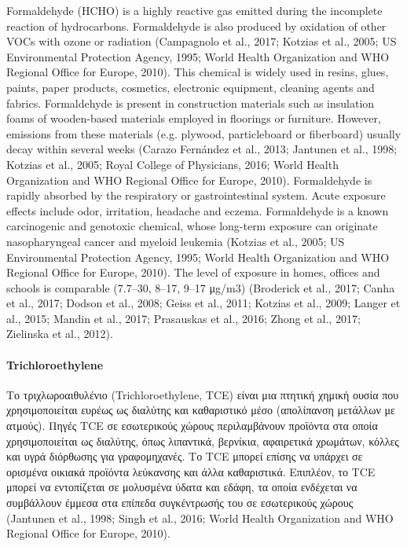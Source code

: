 Formaldehyde (HCHO) is a highly reactive gas emitted during the incomplete reaction of hydrocarbons. Formaldehyde is also produced by oxidation of other VOCs with ozone or radiation (Campagnolo et al., 2017; Kotzias et al., 2005; US Environmental Protection Agency, 1995; World Health Organization and WHO Regional Office for Europe, 2010). This chemical is widely used in resins, glues, paints, paper products, cosmetics, electronic equipment, cleaning agents and fabrics. Formaldehyde is present in construction materials such as insulation foams of wooden-based materials employed in floorings or furniture. However, emissions from these materials (e.g. plywood, particleboard or fiberboard) usually decay within several weeks (Carazo Fernández et al., 2013; Jantunen et al., 1998; Kotzias et al., 2005; Royal College of Physicians, 2016; World Health Organization and WHO Regional Office for Europe, 2010). Formaldehyde is rapidly absorbed by the respiratory or gastrointestinal system. Acute exposure effects include odor, irritation, headache and eczema. Formaldehyde is a known carcinogenic and genotoxic chemical, whose long-term exposure can originate nasopharyngeal cancer and myeloid leukemia (Kotzias et al., 2005; US Environmental Protection Agency, 1995; World Health Organization and WHO Regional Office for Europe, 2010). The level of exposure in homes, offices and schools is comparable (7.7–30, 8–17, 9–17 μg/m3) (Broderick et al., 2017; Canha et al., 2017; Dodson et al., 2008; Geiss et al., 2011; Kotzias et al., 2009; Langer et al., 2015; Mandin et al., 2017; Prasauskas et al., 2016; Zhong et al., 2017; Zielinska et al., 2012).

\paragraph{Trichloroethylene}

Το τριχλωροαιθυλένιο (Trichloroethylene, TCE) είναι μια πτητική χημική ουσία που χρησιμοποιείται ευρέως ως διαλύτης και καθαριστικό μέσο (απολίπανση μετάλλων με ατμούς). Πηγές TCE σε εσωτερικούς χώρους περιλαμβάνουν προϊόντα στα οποία χρησιμοποιείται ως διαλύτης, όπως λιπαντικά, βερνίκια, αφαιρετικά χρωμάτων, κόλλες και υγρά διόρθωσης για γραφομηχανές. Το TCE μπορεί επίσης να υπάρχει σε ορισμένα οικιακά προϊόντα λεύκανσης και άλλα καθαριστικά. Επιπλέον, το TCE μπορεί να εντοπίζεται σε μολυσμένα ύδατα και εδάφη, τα οποία ενδέχεται να συμβάλλουν έμμεσα στα επίπεδα συγκέντρωσής του σε εσωτερικούς χώρους (Jantunen et al., 1998; Singh et al., 2016; World Health Organization and WHO Regional Office for Europe, 2010).

